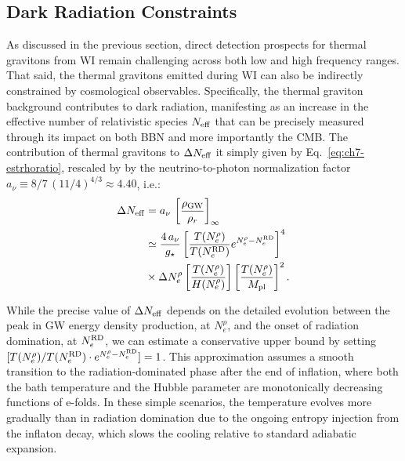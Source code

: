 \subsection{Dark Radiation Constraints}

As discussed in the previous section, direct detection prospects for thermal gravitons from WI remain challenging across both low and high frequency ranges. That said, the thermal gravitons emitted during WI can also be indirectly constrained by cosmological observables. Specifically, the thermal graviton background  contributes to dark radiation, manifesting as an increase in the effective number of relativistic species $N_{\rm eff}$ that can be precisely measured through its impact on both BBN and more importantly the CMB. The contribution of thermal gravitons to $\Delta N_{\rm eff}$ it simply given by Eq.~\eqref{eq:ch7-estrhoratio}, rescaled by by the neutrino-to-photon normalization factor $a_\nu\equiv 8/7\,\left(11/4\right)^{4/3}\approx 4.40$, i.e.:
\begin{align}
    \Delta N_{\rm eff}&=a_\nu\, \left[\frac{\rho_{\rm GW}}{\rho_r}\right]_\infty \nonumber \\
    &\simeq
    \frac{4\, a_\nu}{g_{\star}}\left[\frac{T(N_e^{\rho})}{T(N_e^{\rm RD})}e^{N_e^{\rho}-N_e^{\rm RD}}\right]^4 \nonumber \\
   &\times\Delta N_{e}^{\rho}\left[\frac{T(N_e^{\rho})}{ H(N_e^{\rho})}\right]\left[\frac{T(N_e^{\rho})}{ M_{\rm pl}}\right]^2.
   \label{eq:ch7-estY2}
\end{align}

While the precise value of $\Delta N_{\rm eff}$ depends on the detailed evolution between the peak in GW energy density production, at $N_e^\rho$, and the onset of radiation domination, at $N_e^{\rm RD}$, we can estimate a conservative upper bound by setting $[T(N_e^{\rho})/T(N_e^{\rm RD})\cdot e^{N_e^{\rho}-N_e^{\rm RD}}]=1$. This approximation assumes a smooth transition to the radiation-dominated phase after the end of inflation, where both the bath temperature and the Hubble parameter are monotonically decreasing functions of e-folds. In these simple scenarios,  the temperature evolves more gradually than in radiation domination due to the ongoing entropy injection from the inflaton decay, which slows the cooling relative to standard adiabatic expansion.


